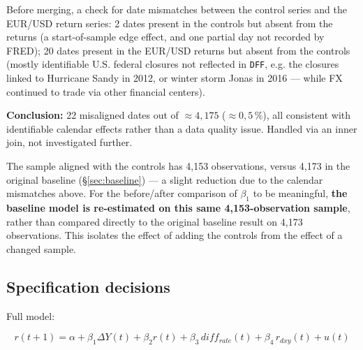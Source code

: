 \documentclass[12pt,a4paper]{article}
\begin{document}
Before merging, a check for date mismatches between the
control series and the EUR/USD return series: 2 dates present in the
controls but absent from the returns (a start-of-sample edge
effect, and one partial day not recorded by FRED); 20
dates present in the EUR/USD returns but absent from the
controls (mostly identifiable U.S. federal
closures not reflected in \texttt{DFF}, e.g. the
closures linked to Hurricane Sandy in 2012, or winter storm
Jonas in 2016 --- while FX continued to trade via
other financial centers).

\vspace{0.2cm}

\textbf{Conclusion:} 22 misaligned dates out of $\approx 4,175$
($\approx 0{,}5\,\%$), all consistent with identifiable calendar
effects rather than a data quality issue. Handled
via an inner join, not investigated further.

The sample aligned with the controls has 4,153
observations, versus 4,173 in the original baseline
(\S\ref{sec:baseline}) --- a slight reduction due to the calendar
mismatches above. For the before/after comparison of $\beta_1$
to be meaningful, \textbf{the baseline model is
	re-estimated on this same 4,153-observation sample}, rather than
compared directly to the original baseline result on 4,173
observations. This isolates the effect of adding the controls from the
effect of a changed sample.

\subsection{Specification decisions}

Full model:

\begin{keyeq}
	\begin{equation}
		r(t+1) = \alpha + \beta_1 \Delta Y(t) + \beta_2 r(t) + \beta_3\,
		diff_{rate}(t) + \beta_4\, r_{dxy}(t) + u(t)
	\end{equation}
\end{keyeq}
\end{document}
